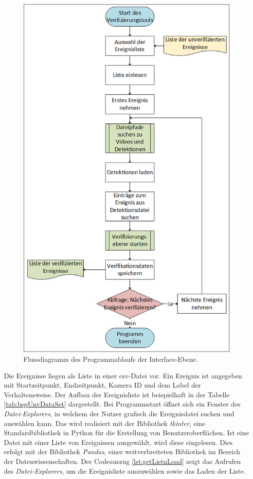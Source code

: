 \begin{figure}[p]
    \centering
    \includegraphics[height=0.9\textheight]{img/Grafiken/Flussdiagramm Interface-Ebene.png}
    \caption[Flussdiagramm des Programmablaufs der Interface-Ebene.]{Flussdiagramm des Programmablaufs der Interface-Ebene.}
    \label{fig:FlussDia IntefaceEbene}
\end{figure}

Die Ereignisse liegen als Liste in einer csv-Datei vor. Ein Ereignis ist angegeben mit Startzeitpunkt, Endzeitpunkt, Kamera ID und dem Label der Verhaltensweise. Der Aufbau der Ereignisliste ist beispielhaft in der Tabelle \ref{tab:bspUnvDataSet} dargestellt. Bei Programmstart öffnet sich ein Fenster des \textit{Datei-Explorers}, in welchem der Nutzer grafisch die Ereignisdatei suchen und auswählen kann. Das wird realisiert mit der \gls{Bibliothek} \textit{tkinter}, eine Standardbibliothek in Python für die Erstellung von Benutzeroberflächen. Ist eine Datei mit einer Liste von Ereignissen ausgewählt, wird diese eingelesen. Dies erfolgt mit der Bibliothek \textit{Pandas}, einer weitverbreiteten Bibliothek im Bereich der Datenwissenschaften. Der Codeauszug \ref{lst:getListnLoad} zeigt das Aufrufen des \textit{Datei-Explorers}, um die Ereignisliste auszuwählen sowie das Laden der Liste.

